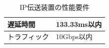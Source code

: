 \begin{table}[htbp]
  \caption{IP伝送装置の性能要件}
  \label{tb:ip-youken}
  \begin{center}
  \begin{tabular}{l|l}
    \hline
    遅延時間    & 133.33ms以内 \\\hline
    トラフィック & 10Gbps以内 \\\hline
  \end{tabular}\end{center}
\end{table}


%
%
%
%
%
%
%
%

%
%
%
%
%

